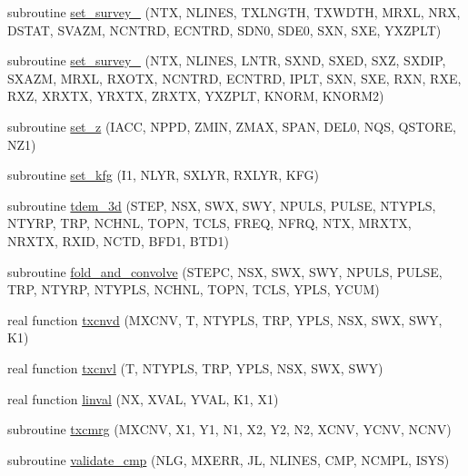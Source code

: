 \begin{DoxyCompactItemize}
\item 
subroutine \hyperlink{Leroi_8f90_ac15d94df59fcf9ff238738e88ec7ada0}{set\+\_\+survey\+\_} (N\+TX, N\+L\+I\+N\+ES, T\+X\+L\+N\+G\+TH, T\+X\+W\+D\+TH, M\+R\+XL, N\+RX, D\+S\+T\+AT, S\+V\+A\+ZM, N\+C\+N\+T\+RD, E\+C\+N\+T\+RD, S\+D\+N0, S\+D\+E0, S\+XN, S\+XE, Y\+X\+Z\+P\+LT)
\item 
subroutine \hyperlink{Leroi_8f90_a0fbc525b8664d780f1158e1061046731}{set\+\_\+survey\+\_} (N\+TX, N\+L\+I\+N\+ES, L\+N\+TR, S\+X\+ND, S\+X\+ED, S\+XZ, S\+X\+D\+IP, S\+X\+A\+ZM, M\+R\+XL, R\+X\+O\+TX, N\+C\+N\+T\+RD, E\+C\+N\+T\+RD, I\+P\+LT, S\+XN, S\+XE, R\+XN, R\+XE, R\+XZ, X\+R\+X\+TX, Y\+R\+X\+TX, Z\+R\+X\+TX, Y\+X\+Z\+P\+LT, K\+N\+O\+RM, K\+N\+O\+R\+M2)
\item 
subroutine \hyperlink{Leroi_8f90_aebaab3e30630bc52f3b79ccbc924f89c}{set\+\_\+z} (I\+A\+CC, N\+P\+PD, Z\+M\+IN, Z\+M\+AX, S\+P\+AN, D\+E\+L0, N\+QS, Q\+S\+T\+O\+RE, N\+Z1)
\item 
subroutine \hyperlink{Leroi_8f90_a8e7ce2c7dc3e5ee45a8adefc6e6bba97}{set\+\_\+kfg} (I1, N\+L\+YR, S\+X\+L\+YR, R\+X\+L\+YR, K\+FG)
\item 
subroutine \hyperlink{Leroi_8f90_a9459812f7e65c931ea1310423669f22a}{tdem\+\_\+3d} (S\+T\+EP, N\+SX, S\+WX, S\+WY, N\+P\+U\+LS, P\+U\+L\+SE, N\+T\+Y\+P\+LS, N\+T\+Y\+RP, T\+RP, N\+C\+H\+NL, T\+O\+PN, T\+C\+LS, F\+R\+EQ, N\+F\+RQ, N\+TX, M\+R\+X\+TX, N\+R\+X\+TX, R\+X\+ID, N\+C\+TD, B\+F\+D1, B\+T\+D1)
\item 
subroutine \hyperlink{Leroi_8f90_adf5b72e5e0c8b51d6d076cc274531811}{fold\+\_\+and\+\_\+convolve} (S\+T\+E\+PC, N\+SX, S\+WX, S\+WY, N\+P\+U\+LS, P\+U\+L\+SE, T\+RP, N\+T\+Y\+RP, N\+T\+Y\+P\+LS, N\+C\+H\+NL, T\+O\+PN, T\+C\+LS, Y\+P\+LS, Y\+C\+UM)
\item 
real function \hyperlink{Leroi_8f90_a1cdfcb6ee629073412c28d9cf0215636}{txcnvd} (M\+X\+C\+NV, T, N\+T\+Y\+P\+LS, T\+RP, Y\+P\+LS, N\+SX, S\+WX, S\+WY, K1)
\item 
real function \hyperlink{Leroi_8f90_a1cb0065a1b3068676ef2beb814db93f5}{txcnvl} (T, N\+T\+Y\+P\+LS, T\+RP, Y\+P\+LS, N\+SX, S\+WX, S\+WY)
\item 
real function \hyperlink{Leroi_8f90_accb3ec8ce6fe855a60b0c1959fc6e2c8}{linval} (NX, X\+V\+AL, Y\+V\+AL, K1, X1)
\item 
subroutine \hyperlink{Leroi_8f90_a91b093a6d74ab88b54c4e2121d31ffa2}{txcmrg} (M\+X\+C\+NV, X1, Y1, N1, X2, Y2, N2, X\+C\+NV, Y\+C\+NV, N\+C\+NV)
\item 
subroutine \hyperlink{Leroi_8f90_aa934c3b9754a6a8e18f83b6de33a0df8}{validate\+\_\+cmp} (N\+LG, M\+X\+E\+RR, JL, N\+L\+I\+N\+ES, C\+MP, N\+C\+M\+PL, I\+S\+YS)

\end{DoxyCompactItemize}
